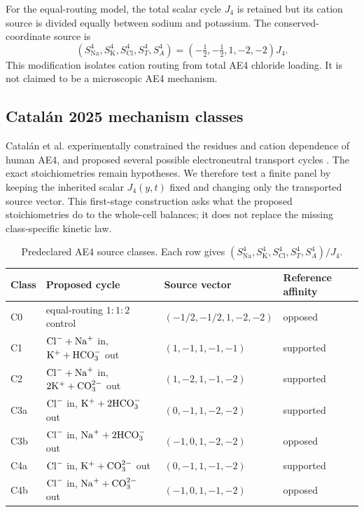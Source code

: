 For the equal-routing model, the total scalar cycle $J_4$ is retained but its cation source is divided equally between sodium and potassium. The conserved-coordinate source is
\begin{equation}
    \left(S^4_{\mathrm{Na}},S^4_{\mathrm K},S^4_{\mathrm{Cl}},S^4_T,S^4_A\right)
    =\left(-\tfrac12,-\tfrac12,1,-2,-2\right)J_4.
    \label{eq:equal-routing-source}
\end{equation}
This modification isolates cation routing from total AE4 chloride loading. It is not claimed to be a microscopic AE4 mechanism.

\subsection{Catalán 2025 mechanism classes}
\label{sec:catalan-classes}

Catalán et al. experimentally constrained the residues and cation dependence of human AE4, and proposed several possible electroneutral transport cycles \citep{Catalan2025}. The exact stoichiometries remain hypotheses. We therefore test a finite panel by keeping the inherited scalar $J_4(y,t)$ fixed and changing only the transported source vector. This first-stage construction asks what the proposed stoichiometries do to the whole-cell balances; it does not replace the missing class-specific kinetic law.

\begin{table}[t]
\centering
\caption{Predeclared AE4 source classes. Each row gives $(S_{\mathrm{Na}}^4,S_{\mathrm K}^4,S_{\mathrm{Cl}}^4,S_T^4,S_A^4)/J_4$.}
\label{tab:mechanism-classes}
\footnotesize
\begin{tabularx}{\textwidth}{lXXl}
\toprule
Class & Proposed cycle & Source vector & Reference affinity \\
\midrule
C0 & equal-routing $1:1:2$ control & $(-1/2,-1/2,1,-2,-2)$ & opposed \\
C1 & $\mathrm{Cl}^{-}+\mathrm{Na}^{+}$ in, $\mathrm{K}^{+}+\mathrm{HCO}_{3}^{-}$ out & $(1,-1,1,-1,-1)$ & supported \\
C2 & $\mathrm{Cl}^{-}+\mathrm{Na}^{+}$ in, $2\mathrm{K}^{+}+\mathrm{CO}_{3}^{2-}$ out & $(1,-2,1,-1,-2)$ & supported \\
C3a & $\mathrm{Cl}^{-}$ in, $\mathrm{K}^{+}+2\mathrm{HCO}_{3}^{-}$ out & $(0,-1,1,-2,-2)$ & supported \\
C3b & $\mathrm{Cl}^{-}$ in, $\mathrm{Na}^{+}+2\mathrm{HCO}_{3}^{-}$ out & $(-1,0,1,-2,-2)$ & opposed \\
C4a & $\mathrm{Cl}^{-}$ in, $\mathrm{K}^{+}+\mathrm{CO}_{3}^{2-}$ out & $(0,-1,1,-1,-2)$ & supported \\
C4b & $\mathrm{Cl}^{-}$ in, $\mathrm{Na}^{+}+\mathrm{CO}_{3}^{2-}$ out & $(-1,0,1,-1,-2)$ & opposed \\
\bottomrule
\end{tabularx}
\end{table}

